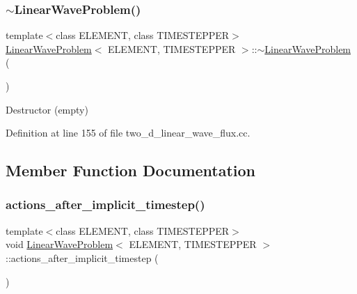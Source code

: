 \mbox{\label{classLinearWaveProblem_af1f3879114813b0acdfd2567c5c7b1e9}} 
\subsubsection{\texorpdfstring{$\sim$\+Linear\+Wave\+Problem()}{~LinearWaveProblem()}\hspace{0.1cm}{\footnotesize\ttfamily [2/2]}}
{\footnotesize\ttfamily template$<$class E\+L\+E\+M\+E\+NT, class T\+I\+M\+E\+S\+T\+E\+P\+P\+ER$>$ \\
\hyperlink{classLinearWaveProblem}{Linear\+Wave\+Problem}$<$ E\+L\+E\+M\+E\+NT, T\+I\+M\+E\+S\+T\+E\+P\+P\+ER $>$\+::$\sim$\hyperlink{classLinearWaveProblem}{Linear\+Wave\+Problem} (\begin{DoxyParamCaption}{ }\end{DoxyParamCaption})\hspace{0.3cm}{\ttfamily [inline]}}



Destructor (empty) 



Definition at line 155 of file two\+\_\+d\+\_\+linear\+\_\+wave\+\_\+flux.\+cc.



\subsection{Member Function Documentation}
\mbox{\label{classLinearWaveProblem_a521290f43f9aac37c9604e744fa71075}} 
\subsubsection{\texorpdfstring{actions\+\_\+after\+\_\+implicit\+\_\+timestep()}{actions\_after\_implicit\_timestep()}\hspace{0.1cm}{\footnotesize\ttfamily [1/2]}}
{\footnotesize\ttfamily template$<$class E\+L\+E\+M\+E\+NT, class T\+I\+M\+E\+S\+T\+E\+P\+P\+ER$>$ \\
void \hyperlink{classLinearWaveProblem}{Linear\+Wave\+Problem}$<$ E\+L\+E\+M\+E\+NT, T\+I\+M\+E\+S\+T\+E\+P\+P\+ER $>$\+::actions\+\_\+after\+\_\+implicit\+\_\+timestep (\begin{DoxyParamCaption}{ }\end{DoxyParamCaption})\hspace{0.3cm}{\ttfamily [inline]}}



